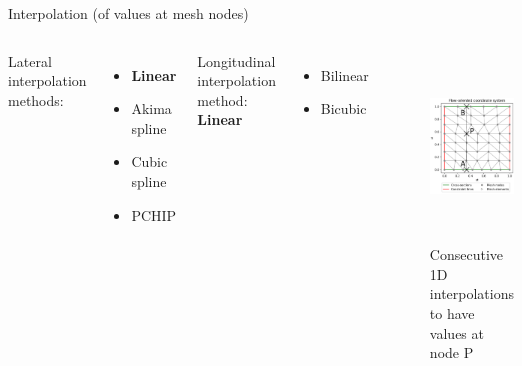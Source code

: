 \documentclass[10pt]{beamer}
\begin{document}
\begin{frame}{Interpolation (of values at mesh nodes)}

  \begin{columns}[T,onlytextwidth]
Lateral interpolation methods:
\begin{itemize}
    \item \textbf{Linear}
    \item Akima spline
    \item Cubic spline
    \item PCHIP
\end{itemize}

Longitudinal interpolation method: \textbf{Linear}

\begin{itemize}
    \item Bilinear
    \item Bicubic
\end{itemize}

\begin{figure}[H]
    \centering
        \includegraphics[height=5cm]{figures/plot_mesh_principle_6.png}
        \caption{Consecutive 1D interpolations to have values at node P}
\end{figure}
  \end{columns}

\end{frame}
\end{document}
